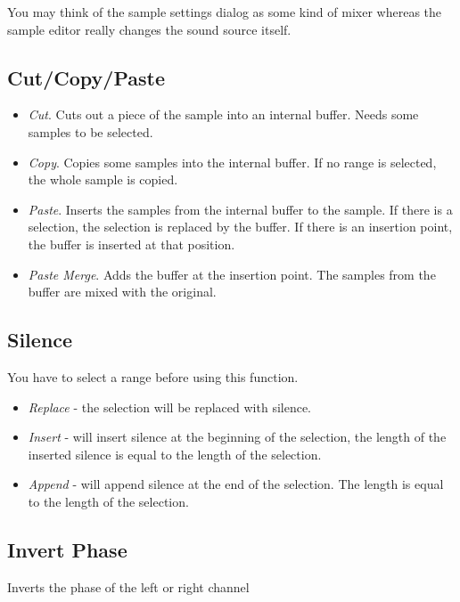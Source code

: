 \documentclass[letterpaper]{report}
\begin{document}
You may think of the sample settings dialog as some kind of mixer
whereas the sample editor really changes the sound source itself.

\subsection{Cut/Copy/Paste}

\begin{itemize}

\item {\em Cut}. Cuts out a piece of the sample into an internal buffer. Needs
some samples to be selected.

\item {\em Copy}. Copies some samples into the internal buffer. If no range is
selected, the whole sample is copied.

\item {\em Paste}. Inserts the samples from the internal buffer to the sample.
If there is a selection, the selection is replaced by the buffer. If there
is an insertion point, the buffer is inserted at that position.

\item {\em Paste Merge}. Adds the buffer at the insertion point. The samples
from the buffer are mixed with the original.

\end{itemize}



\subsection{Silence}

You have to select a range before using this function.
\begin{itemize}
\item {\em Replace} - the selection will be replaced with silence.
\item {\em Insert} - will insert silence at the beginning of the selection,
the length of the inserted silence is equal to the length of the selection.
\item {\em Append} - will append silence at the end of the selection. The
length is equal to the length of the selection.
\end{itemize}


\subsection{Invert Phase}
Inverts the phase of the left or right channel
\end{document}
